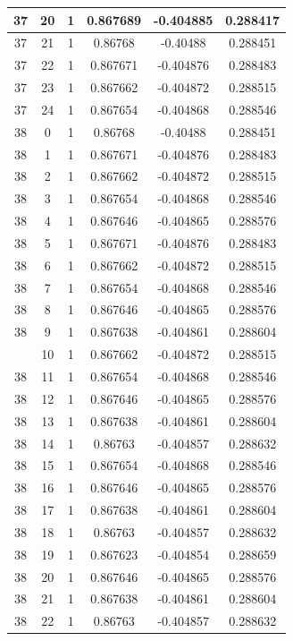 \documentclass[12pt,a4paper]{article}
\numberwithin{equation}{section}
\numberwithin{figure}{section}
\numberwithin{table}{section}
\begin{document}
\begin{longtable}{|c|c|c|c|c|c|}
37 & 20 & 1 & 0.867689 & -0.404885 & 0.288417 \\ \hline
37 & 21 & 1 & 0.86768 & -0.40488 & 0.288451 \\ \hline
37 & 22 & 1 & 0.867671 & -0.404876 & 0.288483 \\ \hline
37 & 23 & 1 & 0.867662 & -0.404872 & 0.288515 \\ \hline
37 & 24 & 1 & 0.867654 & -0.404868 & 0.288546 \\ \hline
38 & 0 & 1 & 0.86768 & -0.40488 & 0.288451 \\ \hline
38 & 1 & 1 & 0.867671 & -0.404876 & 0.288483 \\ \hline
38 & 2 & 1 & 0.867662 & -0.404872 & 0.288515 \\ \hline
38 & 3 & 1 & 0.867654 & -0.404868 & 0.288546 \\ \hline
38 & 4 & 1 & 0.867646 & -0.404865 & 0.288576 \\ \hline
38 & 5 & 1 & 0.867671 & -0.404876 & 0.288483 \\ \hline
38 & 6 & 1 & 0.867662 & -0.404872 & 0.288515 \\ \hline
38 & 7 & 1 & 0.867654 & -0.404868 & 0.288546 \\ \hline
38 & 8 & 1 & 0.867646 & -0.404865 & 0.288576 \\ \hline
38 & 9 & 1 & 0.867638 & -0.404861 & 0.288604 \\ \hline
\pagebreak
38 & 10 & 1 & 0.867662 & -0.404872 & 0.288515 \\ \hline
38 & 11 & 1 & 0.867654 & -0.404868 & 0.288546 \\ \hline
38 & 12 & 1 & 0.867646 & -0.404865 & 0.288576 \\ \hline
38 & 13 & 1 & 0.867638 & -0.404861 & 0.288604 \\ \hline
38 & 14 & 1 & 0.86763 & -0.404857 & 0.288632 \\ \hline
38 & 15 & 1 & 0.867654 & -0.404868 & 0.288546 \\ \hline
38 & 16 & 1 & 0.867646 & -0.404865 & 0.288576 \\ \hline
38 & 17 & 1 & 0.867638 & -0.404861 & 0.288604 \\ \hline
38 & 18 & 1 & 0.86763 & -0.404857 & 0.288632 \\ \hline
38 & 19 & 1 & 0.867623 & -0.404854 & 0.288659 \\ \hline
38 & 20 & 1 & 0.867646 & -0.404865 & 0.288576 \\ \hline
38 & 21 & 1 & 0.867638 & -0.404861 & 0.288604 \\ \hline
38 & 22 & 1 & 0.86763 & -0.404857 & 0.288632 \\ \hline

\end{longtable}
\end{document}
